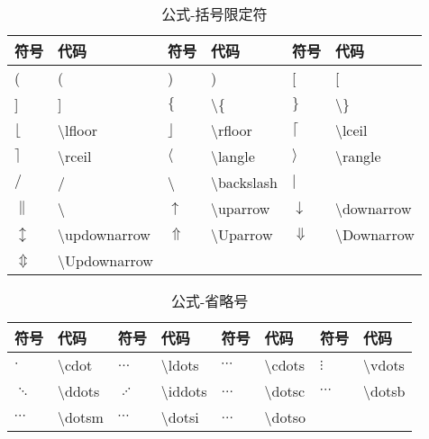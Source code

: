 \documentclass[UTF8,fontset=ubuntu]{ctexart}
\begin{document}
\begin{table}[H]
\begin{minipage}{\textwidth}
\begin{tabular}{l l l l l l}
	\hline
	符号 & 代码 & 符号 & 代码 & 符号 & 代码\\
	\hline
	( & ( & ) & ) & [ & [\\
	] & ] & $\{$ & \textbackslash \{ & $\}$ & \textbackslash \}\\
	$\lfloor$ & \textbackslash lfloor & $\rfloor$ & \textbackslash rfloor & $\lceil$ & \textbackslash lceil\\
	$\rceil$ & \textbackslash rceil & $\langle$ & \textbackslash langle & $\rangle$ & \textbackslash rangle\\
	$/$ & / & \textbackslash & \textbackslash backslash & $|$ & \textbar\\
	$\|$ & \textbackslash\textbar & $\uparrow$ & \textbackslash uparrow & $\downarrow$ & \textbackslash downarrow\\
	$\updownarrow$ & \textbackslash updownarrow & $\Uparrow$ & \textbackslash Uparrow & $\Downarrow$ & \textbackslash Downarrow\\
	$\Updownarrow$ & \textbackslash  Updownarrow\\
	\hline
\end{tabular}
\end{minipage}
\caption{公式-括号限定符}
\end{table}

\begin{table}[H]
\begin{minipage}{\textwidth}
\begin{tabular}{l l l l l l l l}
	\hline
	符号 & 代码 & 符号 & 代码 & 符号 & 代码 & 符号 & 代码\\
	\hline
	$\cdot$ & \textbackslash  cdot & $\ldots$ & \textbackslash  ldots\footnotemark[1] & $\cdots$ & \textbackslash  cdots & $\vdots$ & \textbackslash  vdots\footnotemark[1]\\
	$\ddots$ & \textbackslash  ddots\footnotemark[1] & $\iddots$ & \textbackslash  iddots\footnotemark[2] & $\dotsc$ & \textbackslash  dotsc\footnotemark[3] & $\dotsb$ & \textbackslash  dotsb\footnotemark[3]\\
	$\dotsm$ & \textbackslash  dotsm\footnotemark[3] & $\dotsi$ & \textbackslash  dotsi\footnotemark[3] & $\dotso$ & \textbackslash  dotso\footnotemark[3]\\
	\hline
\end{tabular}
\end{minipage}
\caption{公式-省略号}
\end{table}
\end{document}
